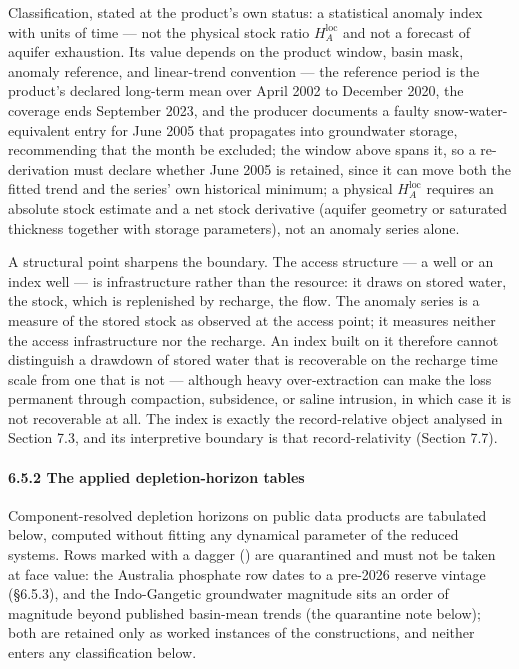 \documentclass[11pt]{article}
\begin{document}
Classification, stated at the product's own status: a statistical
anomaly index with units of time --- not the physical stock ratio
\(H_A^{\mathrm{loc}}\) and not a forecast of aquifer exhaustion. Its value depends on the product window, basin mask, anomaly reference, and linear-trend convention
--- the reference period is the product's declared long-term mean over April 2002 to December 2020,
the coverage ends September 2023, and the producer documents a faulty snow-water-equivalent entry for
June 2005 that propagates into groundwater storage, recommending that the month be excluded; the
window above spans it, so a re-derivation must declare whether June 2005 is retained, since it can
move both the fitted trend and the series' own historical minimum; a physical \(H_A^{\mathrm{loc}}\) requires an
absolute stock estimate and a net stock derivative (aquifer geometry or
saturated thickness together with storage parameters), not an anomaly
series alone.

A structural point sharpens the boundary. The access structure --- a
well or an index well --- is infrastructure rather than the resource: it
draws on stored water, the stock, which is replenished by recharge, the
flow. The anomaly series is a measure of the stored stock as observed at
the access point; it measures neither the access infrastructure nor the
recharge. An index built on it therefore cannot distinguish a drawdown
of stored water that is recoverable on the recharge time scale from one
that is not --- although heavy over-extraction can make the loss
permanent through compaction, subsidence, or saline intrusion, in which
case it is not recoverable at all. The index is exactly the
record-relative object analysed in Section 7.3, and its interpretive
boundary is that record-relativity (Section 7.7).

\paragraph{6.5.2 The applied depletion-horizon
tables}\label{the-applied-depletion-horizon-tables}

Component-resolved depletion horizons on public data products are
tabulated below, computed without fitting any dynamical parameter of the
reduced systems. Rows marked with a dagger (\dag{}) are quarantined and must
not be taken at face value: the Australia phosphate row dates to a
pre-2026 reserve vintage (\S{}6.5.3), and the Indo-Gangetic groundwater
magnitude sits an order of magnitude beyond published basin-mean trends
(the quarantine note below); both are retained only as worked instances
of the constructions, and neither enters any classification below.
\end{document}
